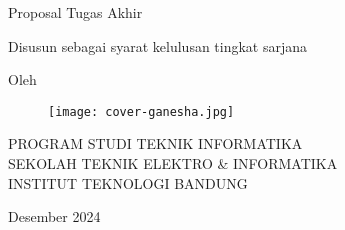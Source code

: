 \clearpage
\pagestyle{empty}

\begin{center}
  \smallskip

  \Large \bfseries \MakeUppercase{\thetitle}
  \vfill

  \Large Proposal Tugas Akhir
  \vfill


  \large Disusun sebagai syarat kelulusan tingkat sarjana
  \vfill

  \large Oleh

  \Large \theauthor

  \vfill
  \begin{figure}[ht]
    \centering
    \texttt{[image: cover-ganesha.jpg]}
  \end{figure}
  \vfill

  \large
  \uppercase{
    Program Studi Teknik Informatika \\
    Sekolah Teknik Elektro \& Informatika \\
    Institut Teknologi Bandung
  }

  Desember 2024

\end{center}

\clearpage
